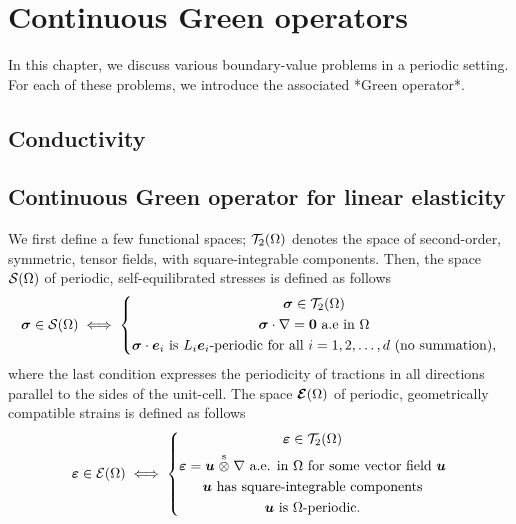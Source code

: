 \chapter{Continuous Green operators}
\label{cha:20210928051857}

In this chapter, we discuss various boundary-value problems in a periodic
setting. For each of these problems, we introduce the associated *Green
operator*.

\section{Conductivity}

\section{Continuous Green operator for linear elasticity}
\label{sec:20210928054233}

We first define a few functional spaces; \(\mathcal T_2(\Omega)\) denotes the
space of second-order, symmetric, tensor fields, with square-integrable
components. Then, the space \(\mathcal S(\Omega)\) of periodic, self-equilibrated
stresses is defined as follows
\begin{equation}
  \boldsymbol\sigma\in\mathcal S(\Omega)\iff\left\{
    \begin{gathered}
      \boldsymbol\sigma\in\mathcal T_2(\Omega)\\
      \boldsymbol\sigma\cdot\nabla=\boldsymbol 0\text{ a.e in }\Omega\\
      \boldsymbol\sigma\cdot\boldsymbol e_i\text{ is }L_i\boldsymbol e_i
      \text{-periodic for all }i=1, 2, \ldots, d\text{ (no summation),}
    \end{gathered}
  \right.
\end{equation}
where the last condition expresses the periodicity of tractions in all
directions parallel to the sides of the unit-cell. The space
\(\boldsymbol{\mathcal E}(\Omega)\) of periodic, geometrically compatible strains is
defined as follows
\begin{equation}
  \boldsymbol\varepsilon\in\mathcal E(\Omega)\iff\left\{
    \begin{gathered}
      \boldsymbol\varepsilon\in\mathcal T_2(\Omega)\\
      \boldsymbol\varepsilon=\boldsymbol u\stackrel{\mathrm{s}}{\otimes}\nabla
      \text{ a.e. in }\Omega\text{ for some vector field }\boldsymbol u\\
      \boldsymbol u\text{ has square-integrable components}\\
      \boldsymbol u\text{ is }\Omega\text{-periodic.}
    \end{gathered}
  \right.
\end{equation}

